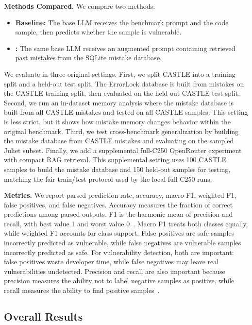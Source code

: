 \noindent\textbf{Methods Compared.}
We compare two methods:
\begin{itemize}
    \item \textbf{Baseline:} The base LLM receives the benchmark prompt and the code sample, then predicts whether the sample is vulnerable.
    \item \textbf{\system:} The same base LLM receives an augmented prompt containing retrieved past mistakes from the SQLite mistake database.
\end{itemize}

We evaluate \system in three original settings. First, we split CASTLE into a training split and a held-out test split. The ErrorLock database is built from mistakes on the CASTLE training split, then evaluated on the held-out CASTLE test split. Second, we run an in-dataset memory analysis where the mistake database is built from all CASTLE mistakes and tested on all CASTLE samples. This setting is less strict, but it shows how mistake memory changes behavior within the original benchmark. Third, we test cross-benchmark generalization by building the mistake database from CASTLE mistakes and evaluating on the sampled Juliet subset. Finally, we add a supplemental full-C250 OpenRouter experiment with compact RAG retrieval. This supplemental setting uses 100 CASTLE samples to build the mistake database and 150 held-out samples for testing, matching the fair train/test protocol used by the local full-C250 runs.

\noindent\textbf{Metrics.}
We report parsed prediction rate, accuracy, macro F1, weighted F1, false positives, and false negatives. Accuracy measures the fraction of correct predictions among parsed outputs. F1 is the harmonic mean of precision and recall, with best value 1 and worst value 0~\cite{sklearn_f1}. Macro F1 treats both classes equally, while weighted F1 accounts for class support. False positives are safe samples incorrectly predicted as vulnerable, while false negatives are vulnerable samples incorrectly predicted as safe. For vulnerability detection, both are important: false positives waste developer time, while false negatives may leave real vulnerabilities undetected. Precision and recall are also important because precision measures the ability not to label negative samples as positive, while recall measures the ability to find positive samples~\cite{sklearn_prfs}.

\subsection{Overall Results}

